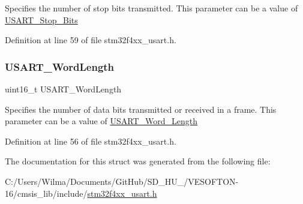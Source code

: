 Specifies the number of stop bits transmitted. This parameter can be a value of \hyperlink{group___u_s_a_r_t___stop___bits}{U\+S\+A\+R\+T\+\_\+\+Stop\+\_\+\+Bits} 

Definition at line 59 of file stm32f4xx\+\_\+usart.\+h.

\mbox{\label{struct_u_s_a_r_t___init_type_def_aa1248b67914e095c0de768223eea9328}} 
\subsubsection{\texorpdfstring{U\+S\+A\+R\+T\+\_\+\+Word\+Length}{USART\_WordLength}}
{\footnotesize\ttfamily uint16\+\_\+t U\+S\+A\+R\+T\+\_\+\+Word\+Length}

Specifies the number of data bits transmitted or received in a frame. This parameter can be a value of \hyperlink{group___u_s_a_r_t___word___length}{U\+S\+A\+R\+T\+\_\+\+Word\+\_\+\+Length} 

Definition at line 56 of file stm32f4xx\+\_\+usart.\+h.



The documentation for this struct was generated from the following file\+:\begin{DoxyCompactItemize}
\item 
C\+:/\+Users/\+Wilma/\+Documents/\+Git\+Hub/\+S\+D\+\_\+\+H\+U\+\_/\+V\+E\+S\+O\+F\+T\+O\+N-\/16/cmsis\+\_\+lib/include/\hyperlink{stm32f4xx__usart_8h}{stm32f4xx\+\_\+usart.\+h}\end{DoxyCompactItemize}
